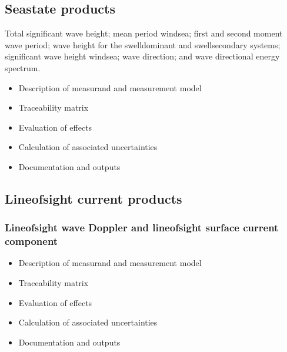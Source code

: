 \documentclass[a4paper,10pt,english]{sphinxmanual}
\begin{document}
\subsection{Sea\sphinxhyphen{}state products}
\label{\detokenize{04_uncertainty_analysis:sea-state-products}}
\sphinxAtStartPar
Total significant wave height; mean period wind\sphinxhyphen{}sea; first and second moment
wave period; wave height for the swell\sphinxhyphen{}dominant and swell\sphinxhyphen{}secondary systems;
significant wave height wind\sphinxhyphen{}sea; wave direction; and wave directional energy
spectrum.
\begin{itemize}
\item {} 
\sphinxAtStartPar
Description of measurand and measurement model

\item {} 
\sphinxAtStartPar
Traceability matrix

\item {} 
\sphinxAtStartPar
Evaluation of effects

\item {} 
\sphinxAtStartPar
Calculation of associated uncertainties

\item {} 
\sphinxAtStartPar
Documentation and outputs

\end{itemize}


\subsection{Line\sphinxhyphen{}of\sphinxhyphen{}sight current products}
\label{\detokenize{04_uncertainty_analysis:line-of-sight-current-products}}

\subsubsection{Line\sphinxhyphen{}of\sphinxhyphen{}sight wave Doppler and line\sphinxhyphen{}of\sphinxhyphen{}sight surface current component}
\label{\detokenize{04_uncertainty_analysis:line-of-sight-wave-doppler-and-line-of-sight-surface-current-component}}\begin{itemize}
\item {} 
\sphinxAtStartPar
Description of measurand and measurement model

\item {} 
\sphinxAtStartPar
Traceability matrix

\item {} 
\sphinxAtStartPar
Evaluation of effects

\item {} 
\sphinxAtStartPar
Calculation of associated uncertainties

\item {} 
\sphinxAtStartPar
Documentation and outputs

\end{itemize}
\end{document}
